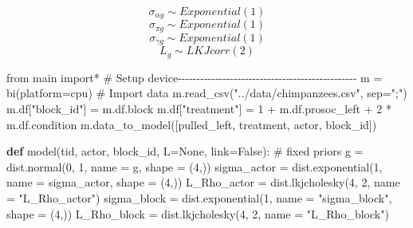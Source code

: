 \documentclass[
  letterpaper,
  DIV=11,
  numbers=noendperiod]{scrreprt}
\newenvironment{Shaded}{\begin{snugshade}}{\end{snugshade}}
\newcommand{\CommentTok}[1]{\textcolor[rgb]{0.37,0.37,0.37}{#1}}
\newcommand{\DecValTok}[1]{\textcolor[rgb]{0.68,0.00,0.00}{#1}}
\newcommand{\ImportTok}[1]{\textcolor[rgb]{0.00,0.46,0.62}{#1}}
\newcommand{\KeywordTok}[1]{\textcolor[rgb]{0.00,0.23,0.31}{\textbf{#1}}}
\newcommand{\NormalTok}[1]{\textcolor[rgb]{0.00,0.23,0.31}{#1}}
\newcommand{\OperatorTok}[1]{\textcolor[rgb]{0.37,0.37,0.37}{#1}}
\newcommand{\StringTok}[1]{\textcolor[rgb]{0.13,0.47,0.30}{#1}}
\newcommand{\VariableTok}[1]{\textcolor[rgb]{0.07,0.07,0.07}{#1}}
\begin{document}
\begin{tcolorbox}
\[
\sigma_{\alpha g} \sim Exponential(1)
\] \[
\sigma_{\pi g} \sim Exponential(1) 
\] \[
\sigma_{\gamma g} \sim Exponential(1)
\] \[
L_{g} \sim LKJcorr(2)
\]

\begin{Shaded}
\begin{Highlighting}[]
\ImportTok{from}\NormalTok{ main }\ImportTok{import}\OperatorTok{*}
\CommentTok{\# Setup device{-}{-}{-}{-}{-}{-}{-}{-}{-}{-}{-}{-}{-}{-}{-}{-}{-}{-}{-}{-}{-}{-}{-}{-}{-}{-}{-}{-}{-}{-}{-}{-}{-}{-}{-}{-}{-}{-}{-}{-}{-}{-}{-}{-}{-}{-}{-}{-}}
\NormalTok{m }\OperatorTok{=}\NormalTok{ bi(platform}\OperatorTok{=}\StringTok{\textquotesingle{}cpu\textquotesingle{}}\NormalTok{)}
\CommentTok{\# Import data}
\NormalTok{m.read\_csv(}\StringTok{"../data/chimpanzees.csv"}\NormalTok{, sep}\OperatorTok{=}\StringTok{";"}\NormalTok{)}
\NormalTok{m.df[}\StringTok{"block\_id"}\NormalTok{] }\OperatorTok{=}\NormalTok{ m.df.block}
\NormalTok{m.df[}\StringTok{"treatment"}\NormalTok{] }\OperatorTok{=} \DecValTok{1} \OperatorTok{+}\NormalTok{ m.df.prosoc\_left }\OperatorTok{+} \DecValTok{2} \OperatorTok{*}\NormalTok{ m.df.condition}
\NormalTok{m.data\_to\_model([}\StringTok{\textquotesingle{}pulled\_left\textquotesingle{}}\NormalTok{, }\StringTok{\textquotesingle{}treatment\textquotesingle{}}\NormalTok{, }\StringTok{\textquotesingle{}actor\textquotesingle{}}\NormalTok{, }\StringTok{\textquotesingle{}block\_id\textquotesingle{}}\NormalTok{])}


\KeywordTok{def}\NormalTok{ model(tid, actor, block\_id, L}\OperatorTok{=}\VariableTok{None}\NormalTok{, link}\OperatorTok{=}\VariableTok{False}\NormalTok{):}
    \CommentTok{\# fixed priors}
\NormalTok{    g }\OperatorTok{=}\NormalTok{ dist.normal(}\DecValTok{0}\NormalTok{, }\DecValTok{1}\NormalTok{, name }\OperatorTok{=} \StringTok{\textquotesingle{}g\textquotesingle{}}\NormalTok{, shape }\OperatorTok{=}\NormalTok{ (}\DecValTok{4}\NormalTok{,))}
\NormalTok{    sigma\_actor }\OperatorTok{=}\NormalTok{ dist.exponential(}\DecValTok{1}\NormalTok{, name }\OperatorTok{=} \StringTok{\textquotesingle{}sigma\_actor\textquotesingle{}}\NormalTok{, shape }\OperatorTok{=}\NormalTok{ (}\DecValTok{4}\NormalTok{,))}
\NormalTok{    L\_Rho\_actor }\OperatorTok{=}\NormalTok{ dist.lkjcholesky(}\DecValTok{4}\NormalTok{, }\DecValTok{2}\NormalTok{, name }\OperatorTok{=} \StringTok{"L\_Rho\_actor"}\NormalTok{)}
\NormalTok{    sigma\_block }\OperatorTok{=}\NormalTok{ dist.exponential(}\DecValTok{1}\NormalTok{, name }\OperatorTok{=} \StringTok{"sigma\_block"}\NormalTok{, shape }\OperatorTok{=}\NormalTok{ (}\DecValTok{4}\NormalTok{,))}
\NormalTok{    L\_Rho\_block }\OperatorTok{=}\NormalTok{ dist.lkjcholesky(}\DecValTok{4}\NormalTok{, }\DecValTok{2}\NormalTok{, name }\OperatorTok{=} \StringTok{"L\_Rho\_block"}\NormalTok{)}


\end{Highlighting}
\end{Shaded}
\end{tcolorbox}
\end{document}
